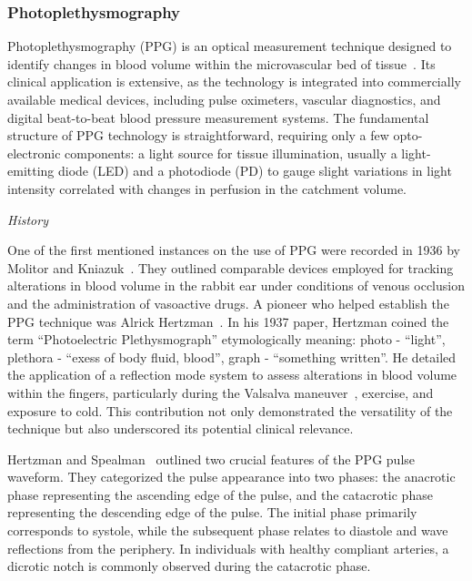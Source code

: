 \subsubsection{Photoplethysmography}
\label{subsubsec:ppg}

Photoplethysmography (PPG) is an optical measurement technique designed to identify changes in blood volume within the microvascular bed of tissue~\cite{challonerPhotoelectricPlethysmographMeasurement1974}.
Its clinical application is extensive, as the technology is integrated into commercially available medical devices, including pulse oximeters, vascular diagnostics, and digital beat-to-beat blood pressure measurement systems.
The fundamental structure of PPG technology is straightforward, requiring only a few opto-electronic components: a light source for tissue illumination, usually a light-emitting diode (LED) and a photodiode (PD) to gauge slight variations in light intensity correlated with changes in perfusion in the catchment volume.

\vspace{0.2cm}
\textit{History}
\vspace{0.2cm}

One of the first mentioned instances on the use of PPG were recorded in 1936 by Molitor and Kniazuk~\cite{molitorNewBloodlessMethod1936}.
They outlined comparable devices employed for tracking alterations in blood volume in the rabbit ear under conditions of venous occlusion and the administration of vasoactive drugs.
A pioneer who helped establish the PPG technique was Alrick Hertzman~\cite{hertzmanPhotoelectricPlethysmographyFingers1937}.
In his 1937 paper, Hertzman coined the term \enquote{Photoelectric Plethysmograph} etymologically meaning:
photo - \enquote{light}, plethora - \enquote{exess of body fluid, blood}, graph - \enquote{something written}.
He detailed the application of a reflection mode system to assess alterations in blood volume within the fingers, particularly during the Valsalva maneuver~\cite{srivastavValsalvaManeuver2024}, exercise, and exposure to cold.
This contribution not only demonstrated the versatility of the technique but also underscored its potential clinical relevance.

Hertzman and Spealman~\cite{hertzmanPhotoelectricPlethysmographyFingers1937} outlined two crucial features of the PPG pulse waveform.
They categorized the pulse appearance into two phases: the anacrotic phase representing the ascending edge of the pulse, and the catacrotic phase representing the descending edge of the pulse.
The initial phase primarily corresponds to systole, while the subsequent phase relates to diastole and wave reflections from the periphery.
In individuals with healthy compliant arteries, a dicrotic notch is commonly observed during the catacrotic phase.

